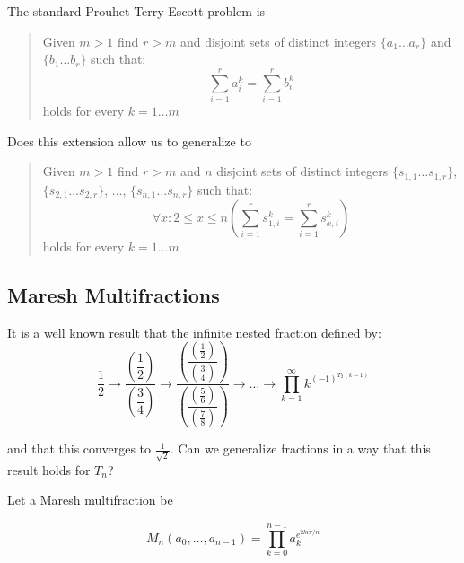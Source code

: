 \documentclass[conference]{IEEEtran}
\begin{document}
The standard Prouhet-Terry-Escott problem \cite{Adler_1977, prouhet_1851} is

\begin{quote}
    Given $m > 1$ find $r > m$ and disjoint sets of distinct integers $\{a_1 \dots a_r\}$ and $\{b_1 \dots b_r\}$ such that:
    \begin{equation}
        \sum_{i=1}^r a_i^k = \sum_{i=1}^r b_i^k
    \end{equation}
    holds for every $k = 1 \dots m$
\end{quote}

Does this extension allow us to generalize to 

\begin{quote}
    Given $m > 1$ find $r > m$ and $n$ disjoint sets of distinct integers $\{s_{1,1} \dots s_{1,r}\}$, $\{s_{2,1} \dots s_{2,r}\}$, $\dots$, $\{s_{n,1} \dots s_{n,r}\}$ such that:
    \begin{equation}
        \forall x : 2 \le x \le n \left(\sum_{i=1}^r s_{1,i}^k = \sum_{i=1}^r s_{x,i}^k \right)
    \end{equation}
    holds for every $k = 1 \dots m$
\end{quote}


\subsection{Maresh Multifractions}

It is a well known result \cite{Allouche-Shallit_1999} that the infinite nested fraction defined by: \begin{equation}
    \dfrac{1}{2} \to \dfrac{\left(\dfrac{1}{2}\right)}{\left(\dfrac{3}{4}\right)} \to \dfrac{\left(\dfrac{\left(\tfrac{1}{2}\right)}{\left(\tfrac{3}{4}\right)}\right)}{\left(\dfrac{\left(\tfrac{5}{6}\right)}{\left(\tfrac{7}{8}\right)}\right)} \to \dots \to \prod_{k=1}^\infty k^{(-1)^{T_2(k-1)}}
\end{equation}

and that this converges to $\tfrac{1}{\sqrt{2}}$. Can we generalize fractions in a way that this result holds for $T_n$?

Let a Maresh multifraction \cite{mcirvin_2019} be

\begin{equation}
M_n(a_0, \dots, a_{n-1}) = \prod_{k=0}^{n-1} a_{k}^{e^{2ki \pi/n}}
\end{equation}
\end{document}
